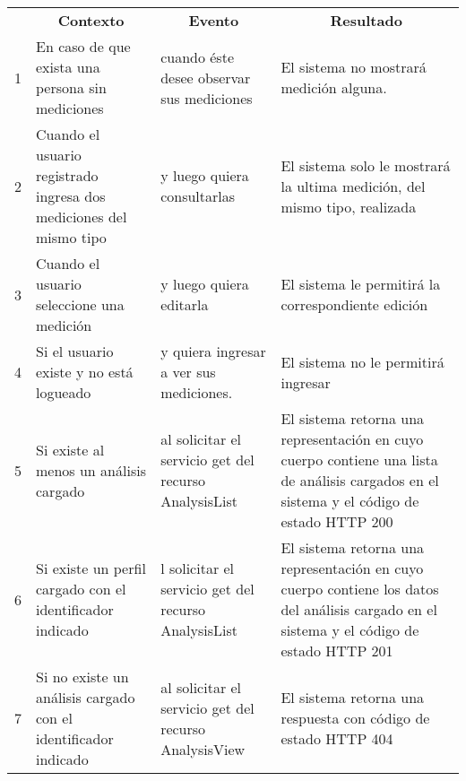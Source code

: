 \begin{center}
\begin{longtable}{|m{0.5cm}|m{4cm}|m{4cm}|m{4.5cm}| }

	\hline 
		\rowcolor[gray]{0.9} 
		\multicolumn{4}{|c|}{\textbf{Criterio de aceptación}} \\
	\hline
    	\rowcolor[gray]{0.9} 
    	\multicolumn{1}{|c}{\textbf{Id}} & \multicolumn{1}{|c}{\textbf{Contexto}} &  \multicolumn{1}{|c}{\textbf{Evento}} & \multicolumn{1}{|c|}{\textbf{Resultado}} \\
    \hline
    \endhead
    	
1&En caso de que exista una persona sin mediciones & cuando éste desee observar sus mediciones  & El sistema no mostrará medición alguna. \\ \hline
 
2& Cuando el usuario registrado ingresa dos mediciones del mismo tipo  & y luego quiera consultarlas & El sistema solo le mostrará la ultima medición, del mismo tipo, realizada\\ \hline

3& Cuando el usuario seleccione una medición & y luego quiera editarla & El sistema le permitirá la correspondiente edición\\ \hline

4& Si el usuario existe y no está logueado & y quiera ingresar a ver sus mediciones. & El sistema no le permitirá ingresar\\ \hline

5& Si existe al menos un análisis cargado & al solicitar el servicio get del recurso AnalysisList & El sistema retorna una representación en cuyo cuerpo contiene una lista de análisis cargados en el sistema y el código de estado HTTP 200\\ \hline

6& Si existe un perfil cargado con el identificador indicado & l solicitar el servicio get del recurso AnalysisList & El sistema retorna una representación en cuyo cuerpo contiene los datos del análisis cargado en el sistema y el código de estado HTTP 201\\ \hline

7& Si no existe un análisis cargado con el identificador indicado & al solicitar el servicio get del recurso AnalysisView & El sistema retorna una respuesta con código de estado HTTP 404\\ \hline
  \end{longtable}
\end{center}


